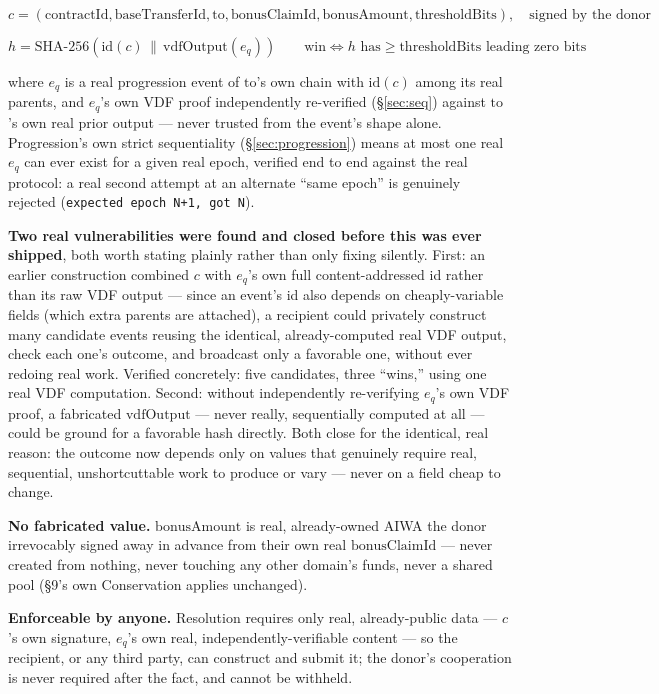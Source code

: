 \documentclass[10pt]{article}
\newcommand{\code}[1]{\texttt{\small #1}}
\begin{document}
\[
c = (\mathrm{contractId}, \mathrm{baseTransferId}, \mathrm{to}, \mathrm{bonusClaimId}, \mathrm{bonusAmount}, \mathrm{thresholdBits}), \quad \text{signed by the donor}
\]

\[
h = \mathrm{SHA\text{-}256}(\mathrm{id}(c) \,\|\, \mathrm{vdfOutput}(e_q)) \qquad \text{win} \iff h \text{ has} \geq \mathrm{thresholdBits} \text{ leading zero bits}
\]

where $e_q$ is a real progression event of $\mathrm{to}$'s own chain with $\mathrm{id}(c)$ among its real parents, and $e_q$'s own VDF proof independently re-verified (\S\ref{sec:seq}) against $\mathrm{to}$'s own real prior output --- never trusted from the event's shape alone. Progression's own strict sequentiality (\S\ref{sec:progression}) means at most one real $e_q$ can ever exist for a given real epoch, verified end to end against the real protocol: a real second attempt at an alternate ``same epoch'' is genuinely rejected (\code{expected epoch N+1, got N}).

\textbf{Two real vulnerabilities were found and closed before this was ever shipped}, both worth stating plainly rather than only fixing silently. First: an earlier construction combined $c$ with $e_q$'s own full content-addressed id rather than its raw VDF output --- since an event's id also depends on cheaply-variable fields (which extra parents are attached), a recipient could privately construct many candidate events reusing the identical, already-computed real VDF output, check each one's outcome, and broadcast only a favorable one, without ever redoing real work. Verified concretely: five candidates, three ``wins,'' using one real VDF computation. Second: without independently re-verifying $e_q$'s own VDF proof, a fabricated $\mathrm{vdfOutput}$ --- never really, sequentially computed at all --- could be ground for a favorable hash directly. Both close for the identical, real reason: the outcome now depends only on values that genuinely require real, sequential, unshortcuttable work to produce or vary --- never on a field cheap to change.

\textbf{No fabricated value.} $\mathrm{bonusAmount}$ is real, already-owned AIWA the donor irrevocably signed away in advance from their own real $\mathrm{bonusClaimId}$ --- never created from nothing, never touching any other domain's funds, never a shared pool (\S9's own Conservation applies unchanged).

\textbf{Enforceable by anyone.} Resolution requires only real, already-public data --- $c$'s own signature, $e_q$'s own real, independently-verifiable content --- so the recipient, or any third party, can construct and submit it; the donor's cooperation is never required after the fact, and cannot be withheld.
\end{document}
